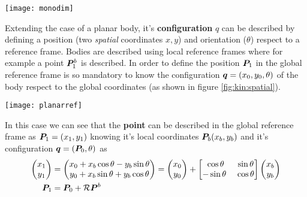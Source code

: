 	\begin{SCfigure}[2][bht]
		\centering \texttt{[image: monodim]}
		\caption{representation of the position of a point moving on one axis using two different reference frames (red and orange).} \label{fig:kin:mono}
	\end{SCfigure}
	
	Extending the case of a planar body, it's \textbf{configuration} $q$ can be described by defining a position (two \textit{spatial} coordinates $x,y$) and orientation ($\theta$) respect to a reference frame. Bodies are described using local reference frames where for example a point $\boldsymbol{P}_1^b$ is described. In order to define the position $\boldsymbol{P}_1$ in the global reference frame is so mandatory to know the configuration $\boldsymbol{q} = (x_0,y_0,\theta)$ of the body respect to the global coordinates (as shown in figure \ref{fig:kin:spatial}).
	\begin{SCfigure}[2][bht]
		\centering \texttt{[image: planarref]}
		\caption{reference frames used for determining the position of a point/vector in the "global" frame knowing it's local coordinates.} 
		\label{fig:kin:spatial}
	\end{SCfigure}
	
	In this case we can see that the \textbf{point} can be described in the global reference frame as $\boldsymbol{P}_1 = (x_1,y_1)$ knowing it's local coordinates $\boldsymbol{P}_b (x_b,y_b)$ and it's configuration $\boldsymbol{q} = (\boldsymbol{P}_0,\theta)$ as
	\begin{equation} \label{eq:kin:2drototrans}
	\begin{split}
		\begin{pmatrix} x_1 \\ y_1 \end{pmatrix} & = \begin{pmatrix} x_0 + x_b \cos \theta - y_b \sin\theta \\ y_0 + x_b\sin\theta + y_b\cos\theta \end{pmatrix} = \begin{pmatrix} x_0 \\ y_0 \end{pmatrix} + \begin{bmatrix} \cos\theta & \sin\theta \\ -\sin\theta\ & \cos\theta \end{bmatrix} \begin{pmatrix} x_b \\y_b \end{pmatrix} \\
		\boldsymbol{P}_1 & = \boldsymbol{P}_0 + \mathcal R \boldsymbol{P}^b
	\end{split}
	\end{equation}
	
